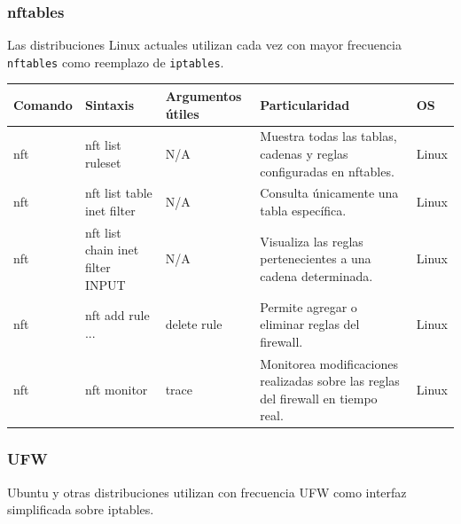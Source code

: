 \documentclass[a4paper,10pt]{article}
\begin{document}

\subsubsection{nftables}

Las distribuciones Linux actuales utilizan cada vez con mayor frecuencia
\texttt{nftables} como reemplazo de \texttt{iptables}.

\begin{longtable}{|p{2.8cm}|p{3cm}|p{4cm}|p{5.6cm}|p{1.5cm}|}

\hline
Comando &
Sintaxis &
Argumentos útiles &
Particularidad &
OS
\\
\hline
\endhead

nft &
nft list ruleset &
N/A &
Muestra todas las tablas, cadenas y reglas configuradas en nftables. &
Linux
\\
\hline

nft &
nft list table inet filter &
N/A &
Consulta únicamente una tabla específica. &
Linux
\\
\hline

nft &
nft list chain inet filter INPUT &
N/A &
Visualiza las reglas pertenecientes a una cadena determinada. &
Linux
\\
\hline

nft &
nft add rule ... &
delete rule &
Permite agregar o eliminar reglas del firewall. &
Linux
\\
\hline

nft &
nft monitor &
trace &
Monitorea modificaciones realizadas sobre las reglas del firewall en tiempo real. &
Linux
\\
\hline

\end{longtable}


\subsubsection{UFW}

Ubuntu y otras distribuciones utilizan con frecuencia UFW como interfaz
simplificada sobre iptables.
\end{document}
